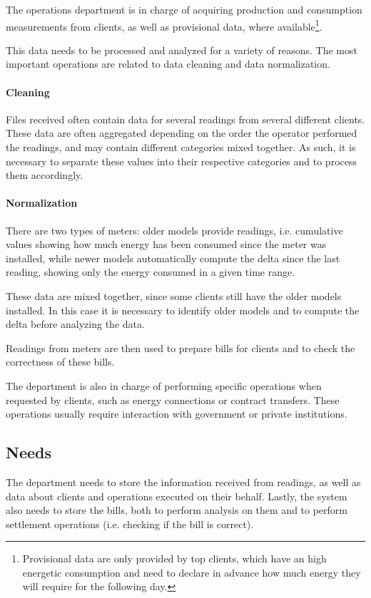 The operations department is in charge of acquiring production and consumption measurements from clients, as well as provisional data, where available\footnote{
    Provisional data are only provided by top clients, which have an high energetic consumption and need to declare in advance how much energy they will require for the following day.
}.

This data needs to be processed and analyzed for a variety of reasons.
The most important operations are related to data cleaning and data normalization.

\paragraph{Cleaning}
    Files received often contain data for several readings from several different clients.
    These data are often aggregated depending on the order the operator performed the readings, and may contain different categories mixed together.
    As such, it is necessary to separate these values into their respective categories and to process them accordingly.
\paragraph{Normalization}
    There are two types of meters: older models provide readings, i.e. cumulative values showing how much energy has been consumed since the meter was installed, while newer models automatically compute the delta since the last reading, showing only the energy consumed in a given time range.
    
    These data are mixed together, since some clients still have the older models installed.
    In this case it is necessary to identify older models and to compute the delta before analyzing the data.\newline
    
Readings from meters are then used to prepare bills for clients and to check the correctness of these bills.

The department is also in charge of performing specific operations when requested by clients, such as energy connections or contract transfers.
These operations usually require interaction with government or private institutions.

\subsection{Needs}
    The department needs to store the information received from readings, as well as data about clients and operations executed on their behalf.
    Lastly, the system also needs to store the bills, both to perform analysis on them and to perform settlement operations (i.e. checking if the bill is correct).

